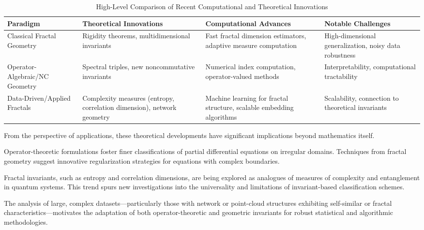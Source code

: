 \documentclass[sigconf]{acmart}
\begin{document}
\begin{table*}[htbp]
\centering
\caption{High-Level Comparison of Recent Computational and Theoretical Innovations}
\label{tab:innovations_summary}
\begin{adjustbox}{max width=\textwidth}
\begin{tabular}{@{}llll@{}}
\toprule
\textbf{Paradigm} & \textbf{Theoretical Innovations} & \textbf{Computational Advances} & \textbf{Notable Challenges} \\
\midrule
Classical Fractal Geometry & Rigidity theorems, multidimensional invariants & Fast fractal dimension estimators, adaptive measure computation & High-dimensional generalization, noisy data robustness \\
Operator-Algebraic/NC Geometry & Spectral triples, new noncommutative invariants & Numerical index computation, operator-valued methods & Interpretability, computational tractability \\
Data-Driven/Applied Fractals & Complexity measures (entropy, correlation dimension), network geometry & Machine learning for fractal structure, scalable embedding algorithms & Scalability, connection to theoretical invariants \\
\bottomrule
\end{tabular}
\end{adjustbox}
\end{table*}

\vspace{1em}
From the perspective of applications, these theoretical developments have significant implications beyond mathematics itself.

Operator-theoretic formulations foster finer classifications of partial differential equations on irregular domains. Techniques from fractal geometry suggest innovative regularization strategies for equations with complex boundaries.

Fractal invariants, such as entropy and correlation dimensions, are being explored as analogues of measures of complexity and entanglement in quantum systems. This trend spurs new investigations into the universality and limitations of invariant-based classification schemes.

The analysis of large, complex datasets—particularly those with network or point-cloud structures exhibiting self-similar or fractal characteristics—motivates the adaptation of both operator-theoretic and geometric invariants for robust statistical and algorithmic methodologies.
\end{document}
